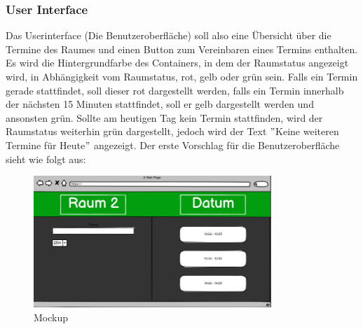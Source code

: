 \subsubsection{User Interface}\label{subsubsec:user-interface}
Das Userinterface (Die Benutzeroberfläche) soll also eine Übersicht über die Termine des Raumes und einen Button zum Vereinbaren eines Termins enthalten.
Es wird die Hintergrundfarbe des Containers, in dem der Raumstatus angezeigt wird, in Abhängigkeit vom Raumstatus, rot, gelb oder grün sein.
Falls ein Termin gerade stattfindet, soll dieser rot dargestellt werden, falls ein Termin innerhalb der nächsten 15 Minuten stattfindet, soll er gelb dargestellt werden und ansonsten grün.
Sollte am heutigen Tag kein Termin stattfinden, wird der Raumstatus weiterhin grün dargestellt, jedoch wird der Text \("\)Keine weiteren Termine für Heute\("\) angezeigt.
\newline
\newline
Der erste Vorschlag für die Benutzeroberfläche sieht wie folgt aus:
\newline
\newline
\newpage
\begin{figure}[h]
    \par\vspace{1cm}
    \centering
    \includegraphics[width=0.8\textwidth]{Bilder/mockup}
    \caption{Mockup}
    \label{fig:Mockup}
    \par\vspace{1cm}
\end{figure}
\justifying
\newline
\newline
